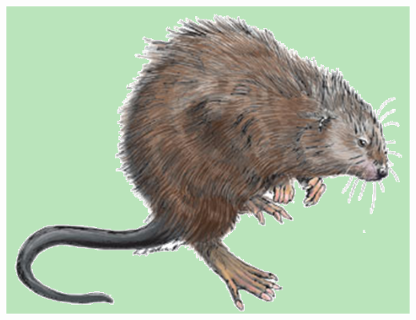 \documentclass[serif]{beamer}\usepackage[]{graphicx}\usepackage[]{color}
\begin{document}
\begin{frame}[fragile]{\includegraphics[width=0.05\paperwidth]{fig/muskrat.png}\hspace{0.07in}{\bf Continuing work and engagement}}
\begin{columns}
\begin{column}{0.45\textwidth}
\end{column}
\begin{column}{0.45\textwidth}
\centerline{}
\end{column}
\end{columns}
\end{frame}
\end{document}
